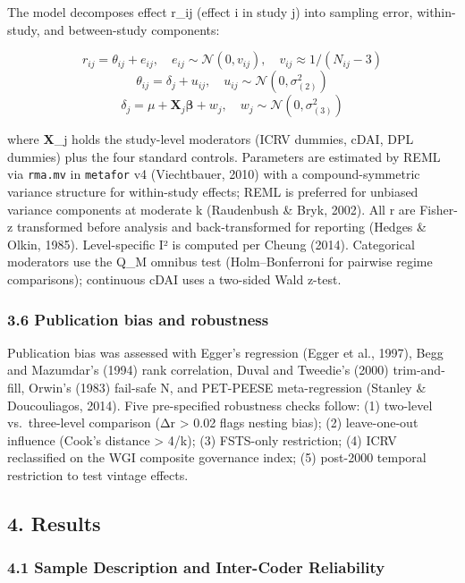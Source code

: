 \documentclass[
  12pt,a4paper]{article}
\begin{document}
The model decomposes effect r\_ij (effect i in study j) into sampling
error, within-study, and between-study components:

\[r_{ij} = \theta_{ij} + e_{ij}, \quad e_{ij} \sim \mathcal{N}(0, v_{ij}), \quad v_{ij} \approx 1/(N_{ij}-3)\]
\[\theta_{ij} = \delta_{j} + u_{ij}, \quad u_{ij} \sim \mathcal{N}(0, \sigma_{(2)}^{2})\]
\[\delta_{j} = \mu + \mathbf{X}_{j}\mathbf{\beta} + w_{j}, \quad w_{j} \sim \mathcal{N}(0, \sigma_{(3)}^{2})\]

where \textbf{X}\_j holds the study-level moderators (ICRV dummies,
cDAI, DPL dummies) plus the four standard controls. Parameters are
estimated by REML via \texttt{rma.mv} in \texttt{metafor} v4
(Viechtbauer, 2010) with a compound-symmetric variance structure for
within-study effects; REML is preferred for unbiased variance components
at moderate k (Raudenbush \& Bryk, 2002). All r are Fisher-z transformed
before analysis and back-transformed for reporting (Hedges \& Olkin,
1985). Level-specific I² is computed per Cheung (2014). Categorical
moderators use the Q\_M omnibus test (Holm--Bonferroni for pairwise
regime comparisons); continuous cDAI uses a two-sided Wald z-test.

\hypertarget{publication-bias-and-robustness}{%
\subsubsection{3.6 Publication bias and
robustness}\label{publication-bias-and-robustness}}

Publication bias was assessed with Egger's regression (Egger et al.,
1997), Begg and Mazumdar's (1994) rank correlation, Duval and Tweedie's
(2000) trim-and-fill, Orwin's (1983) fail-safe N, and PET-PEESE
meta-regression (Stanley \& Doucouliagos, 2014). Five pre-specified
robustness checks follow: (1) two-level vs.~three-level comparison (Δr
\textgreater{} 0.02 flags nesting bias); (2) leave-one-out influence
(Cook's distance \textgreater{} 4/k); (3) FSTS-only restriction; (4)
ICRV reclassified on the WGI composite governance index; (5) post-2000
temporal restriction to test vintage effects.

\hypertarget{results}{%
\subsection{4. Results}\label{results}}

\hypertarget{sample-description-and-inter-coder-reliability}{%
\subsubsection{4.1 Sample Description and Inter-Coder
Reliability}\label{sample-description-and-inter-coder-reliability}}
\end{document}
